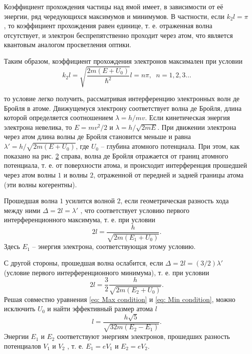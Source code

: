 \documentclass[a4paper,12pt]{article}
\begin{document}
Коэффициент прохождения частицы над ямой имеет, в зависимости от её энергии, ряд чередующихся максимумов и минимумов. В частности, если $k_2l = \pi$, то коэффициент прохождения равен единице, т. е. отраженная волна отсутствует, и электрон беспрепятственно проходит через атом, что является квантовым аналогом просветления оптики.

Таким образом, коэффициент прохождения электронов максимален при условии
\begin{equation}\label{eq: Max condition via n}
    k_2l = \sqrt{\frac{2m(E + U_0)}{\hbar^2}}l = n\pi,\;\; n = 1, 2, 3...
\end{equation}

то условие легко получить, рассматривая интерференцию электронных волн де Бройля в атоме. Движущемуся электрону соответствует волна де Бройля, длина которой определяется соотношением $\lambda = h/mv$. Если кинетическая энергия электрона невелика, то $E = mv^2 / 2$ и $\lambda = h / \sqrt{2mE}$. При движении электрона через атом длина волны де Бройля становится меньше и равна $\lambda' = h / \sqrt{2m(E + U_0)}$, где $U_0$ -- глубина атомного потенциала. При этом, как показано на рис. \hyperref[fig: Potential well scheme]{2} справа, волна де Бройля отражается от границ атомного потенциала, т. е. от поверхности атома, и происходит интерференция прошедшей через атом волны $1$ и волны $2$, отраженной от передней и задней границы атома (эти волны когерентны). 

Прошедшая волна $1$ усилится волной $2$, если геометрическая разность хода между ними $\Delta = 2l = \lambda'$ , что соответствует условию первого интерференционного максимума, т. е. при условии
\begin{equation}\label{eq: Max condition}
    2l = \frac{h}{\sqrt{2m(E_1 + U_0)}}.
\end{equation}
Здесь $E_1$ -- энергия электрона, соответствующая этому условию.

С другой стороны, прошедшая волна ослабится, если $\Delta = 2l = (3/2)\lambda'$ (условие первого интерференционного минимума), т. е. при
условии
\begin{equation}\label{eq: Min condition}
    2l = \frac{3}{2}\frac{h}{\sqrt{2m(E_2 + U_0)}}.
\end{equation}
Решая совместно уравнения \eqref{eq: Max condition} и \eqref{eq: Min condition}, можно исключить $U_0$ и найти эффективный размер атома $l$
\begin{equation}\label{eq: Atom diameter}
    l = \frac{h\sqrt{5}}{\sqrt{32m(E_2 - E_1)}}.
\end{equation}
Энергии $E_1$ и $E_2$ соответствуют энергиям электронов, прошедших разность потенциалов $V_1$ и $V_2$ , т. е. $E_1 = eV_1$ и $E_2 = eV_2$.
\end{document}
